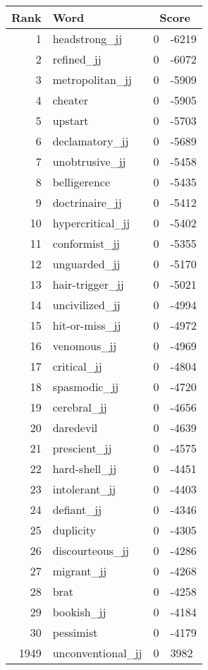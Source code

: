 \begin{longtable}[!htbp]{| rlr@{.}l |}
    \hline
    \textbf{Rank} & \textbf{Word} & \multicolumn{2}{c|}{\textbf{Score}} \\
    \hline
    \endhead
    1 & headstrong\_jj & 0 & -6219 \\
    2 & refined\_jj & 0 & -6072 \\
    3 & metropolitan\_jj & 0 & -5909 \\
    4 & cheater & 0 & -5905 \\
    5 & upstart & 0 & -5703 \\
    6 & declamatory\_jj & 0 & -5689 \\
    7 & unobtrusive\_jj & 0 & -5458 \\
    8 & belligerence & 0 & -5435 \\
    9 & doctrinaire\_jj & 0 & -5412 \\
    10 & hypercritical\_jj & 0 & -5402 \\
    11 & conformist\_jj & 0 & -5355 \\
    12 & unguarded\_jj & 0 & -5170 \\
    13 & hair-trigger\_jj & 0 & -5021 \\
    14 & uncivilized\_jj & 0 & -4994 \\
    15 & hit-or-miss\_jj & 0 & -4972 \\
    16 & venomous\_jj & 0 & -4969 \\
    17 & critical\_jj & 0 & -4804 \\
    18 & spasmodic\_jj & 0 & -4720 \\
    19 & cerebral\_jj & 0 & -4656 \\
    20 & daredevil & 0 & -4639 \\
    21 & prescient\_jj & 0 & -4575 \\
    22 & hard-shell\_jj & 0 & -4451 \\
    23 & intolerant\_jj & 0 & -4403 \\
    24 & defiant\_jj & 0 & -4346 \\
    25 & duplicity & 0 & -4305 \\
    26 & discourteous\_jj & 0 & -4286 \\
    27 & migrant\_jj & 0 & -4268 \\
    28 & brat & 0 & -4258 \\
    29 & bookish\_jj & 0 & -4184 \\
    30 & pessimist & 0 & -4179 \\
    1949 & unconventional\_jj & 0 & 3982 \\

\end{longtable}
